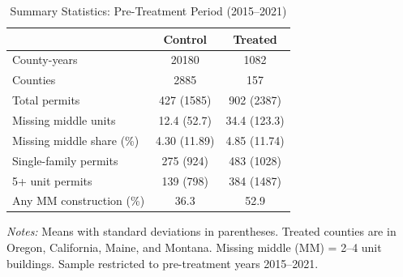 \begin{table}[htbp]
\centering
\caption{Summary Statistics: Pre-Treatment Period (2015--2021)}
\label{tab:sumstats}
\begin{threeparttable}
\begin{tabular}{lcc}
\hline\hline
 & Control & Treated \\
\hline
County-years & 20180 & 1082 \\
Counties & 2885 & 157 \\
Total permits & 427 (1585) & 902 (2387) \\
Missing middle units & 12.4 (52.7) & 34.4 (123.3) \\
Missing middle share (\%) & 4.30 (11.89) & 4.85 (11.74) \\
Single-family permits & 275 (924) & 483 (1028) \\
5+ unit permits & 139 (798) & 384 (1487) \\
Any MM construction (\%) & 36.3 & 52.9 \\
\hline\hline
\end{tabular}
\begin{tablenotes}[flushleft]\small
\item \textit{Notes:} Means with standard deviations in parentheses. Treated counties are in Oregon, California, Maine, and Montana. Missing middle (MM) = 2--4 unit buildings. Sample restricted to pre-treatment years 2015--2021.
\end{tablenotes}
\end{threeparttable}
\end{table}

